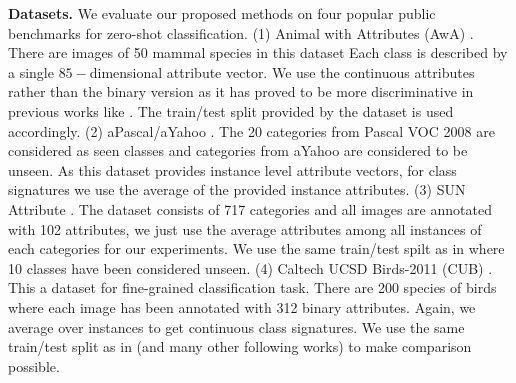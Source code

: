 \documentclass[letterpaper]{article}
\begin{document}
\textbf{Datasets.}
We evaluate our proposed methods on four popular public benchmarks for zero-shot classification.
(1) Animal with Attributes (AwA) \cite{lampert09}. There are images of 50 mammal species in this dataset
Each class is described by a single $85-$dimensional attribute vector. We use the continuous attributes rather than
the binary version as it has proved to be more discriminative in previous works like \cite{Akata2015}. The train/test split provided by the dataset is used accordingly.
(2) aPascal/aYahoo \cite{farhadi09}. The 20 categories from Pascal VOC 2008 \cite{pascal} are considered as seen classes and
categories from aYahoo are considered to be unseen. As this dataset provides instance level attribute vectors,
for class signatures we use the average of the provided instance attributes.
(3) SUN Attribute \cite{sun}. The dataset consists of 717 categories and all images are annotated with 102 attributes, we just
use the average attributes among all instances of each categories for our experiments. We use the same train/test spilt
as in \cite{jayaraman14} where 10 classes have been considered unseen.
(4) Caltech UCSD Birds-2011 (CUB) \cite{cub}. This a dataset for fine-grained classification task. There are 200 species of
birds where each image has been annotated with 312 binary attributes. Again, we average over instances to get continuous class signatures.
We use the same train/test split as in \cite{akata13} (and many other following works) to make comparison possible.
\end{document}

